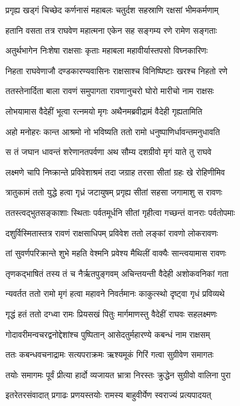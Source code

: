 \twolineshloka
{प्रगृह्य खड्गं चिच्छेद कर्णनासं महाबलः}
{चतुर्दश सहस्राणि रक्षसां भीमकर्मणाम्}

\twolineshloka
{हतानि वसता तत्र राघवेण महात्मना}
{एकेन सह सङ्गम्य रणे रामेण सङ्गताः}

\twolineshloka
{अतुर्थभागेन निःशेषा राक्षसाः कृताः}
{महाबला महावीर्यास्तपसो विघ्नकारिणः}

\twolineshloka
{निहता राघवेणाजौ दण्डकारण्यवासिनः}
{राक्षसाश्च विनिष्पिष्टाः खरश्च निहतो रणे}

\twolineshloka
{ततस्तेनार्दिता बाला रावणं समुपागता}
{रावणानुचरो घोरो मारीचो नाम राक्षसः}

\twolineshloka
{लोभयामास वैदेहीं भूत्वा रत्नमयो मृगः}
{अथैनमब्रवीद्रामं वैदेही गृह्यतामिति}

\twolineshloka
{अहो मनोहरः कान्त आश्रमो नो भविष्यति}
{ततो रामो धनुष्पाणिर्धावन्तमनुधावति}

\twolineshloka
{स तं जघान धावन्तं शरेणानतपर्वणा}
{अथ सौम्य दशग्रीवो मृगं याते तु राघवे}

\twolineshloka
{लक्ष्मणे चापि निष्क्रान्ते प्रविवेशाश्रमं तदा}
{जग्राह तरसा सीतां ग्रहः खे रोहिणीमिव}

\twolineshloka
{त्रातुकामं ततो युद्धे हत्वा गृध्रं जटायुषम्}
{प्रगृह्य सीतां सहसा जगामाशु स रावणः}

\twolineshloka
{ततस्त्वद्भुतसङ्काशाः स्थिताः पर्वतमूर्धनि}
{सीतां गृहीत्वा गच्छन्तं वानराः पर्वतोपमाः}

\twolineshloka
{दशुर्विस्मितास्तत्र रावणं राक्षसाधिपम्}
{प्रविवेश ततो लङ्कां रावणो लोकरावणः}

\twolineshloka
{तां सुवर्णपरिक्रान्ते शुभे महति वेश्मनि}
{प्रवेश्य मैथिलीं वाक्यैः सान्त्वयामास रावणः}

\twolineshloka
{तृणकद्भाषितं तस्य तं च नैर्ऋतपुङ्गवम्}
{अचिन्तयन्ती वैदेही अशोकवनिकां गता}

\twolineshloka
{न्यवर्तत ततो रामो मृगं हत्वा महावने}
{निवर्तमानः काकुत्स्थो दृष्ट्वा गृधं प्रविव्यथे}

\twolineshloka
{गृद्धं हतं ततो दग्ध्वा रामः प्रियसखं पितुः}
{मार्गमाणस्तु वैदेहीं राघवः सहलक्ष्मणः}

\twolineshloka
{गोदावरीमन्वचरद्वनोद्देशांश्च पुष्पितान्}
{आसेदतुर्महारण्ये कबन्धं नाम राक्षसम्}

\twolineshloka
{ततः कबन्धवचनाद्रामः सत्यपराक्रमः}
{ऋश्यमूकं गिरिं गत्वा सुग्रीवेण समागतः}

\twolineshloka
{तयोः समागमः पूर्वं प्रीत्या हार्दो व्यजायत}
{भ्रात्रा निरस्तः क्रुद्धेन सुग्रीवो वालिना पुरा}

\twolineshloka
{इतरेतरसंवादात् प्रगाढः प्रणयस्तयोः}
{रामस्य बाहुवीर्येण स्वराज्यं प्रत्यपादयत्}


